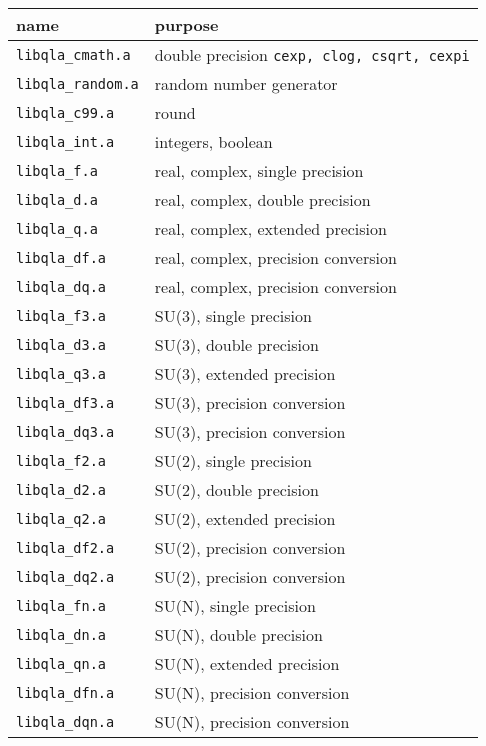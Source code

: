 \documentclass{article}
\newcommand{\ttdash}{{\tt \_}}
\begin{document}
\begin{center}
\begin{tabular}{|l|l|}
\hline
 name & purpose \\
\hline
 {\tt libqla}\ttdash{\tt cmath.a}  & double precision {\tt cexp, clog, csqrt, cexpi} \\
 {\tt libqla}\ttdash{\tt random.a} & random number generator             \\
 {\tt libqla}\ttdash{\tt c99.a}    & round                               \\
 {\tt libqla}\ttdash{\tt int.a}    & integers, boolean                   \\
 {\tt libqla}\ttdash{\tt f.a  }    & real, complex, single precision     \\
 {\tt libqla}\ttdash{\tt d.a  }    & real, complex, double precision     \\
 {\tt libqla}\ttdash{\tt q.a  }    & real, complex, extended precision   \\
 {\tt libqla}\ttdash{\tt df.a }    & real, complex, precision conversion \\
 {\tt libqla}\ttdash{\tt dq.a }    & real, complex, precision conversion \\
 {\tt libqla}\ttdash{\tt f3.a }    & SU(3), single precision             \\
 {\tt libqla}\ttdash{\tt d3.a }    & SU(3), double precision             \\
 {\tt libqla}\ttdash{\tt q3.a }    & SU(3), extended precision           \\
 {\tt libqla}\ttdash{\tt df3.a}    & SU(3), precision conversion         \\
 {\tt libqla}\ttdash{\tt dq3.a}    & SU(3), precision conversion         \\
 {\tt libqla}\ttdash{\tt f2.a }    & SU(2), single precision             \\
 {\tt libqla}\ttdash{\tt d2.a }    & SU(2), double precision             \\
 {\tt libqla}\ttdash{\tt q2.a }    & SU(2), extended precision           \\
 {\tt libqla}\ttdash{\tt df2.a}    & SU(2), precision conversion         \\
 {\tt libqla}\ttdash{\tt dq2.a}    & SU(2), precision conversion         \\
 {\tt libqla}\ttdash{\tt fn.a }    & SU(N), single precision             \\
 {\tt libqla}\ttdash{\tt dn.a }    & SU(N), double precision             \\
 {\tt libqla}\ttdash{\tt qn.a }    & SU(N), extended precision           \\
 {\tt libqla}\ttdash{\tt dfn.a}    & SU(N), precision conversion         \\
 {\tt libqla}\ttdash{\tt dqn.a}    & SU(N), precision conversion         \\
\hline
\end{tabular}
\end{center}
\end{document}
